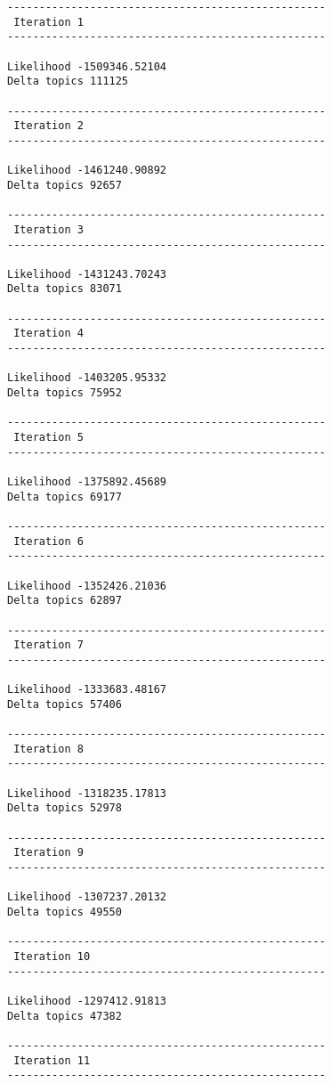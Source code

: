 \documentclass{article}
\begin{document}
    \begin{Verbatim}[commandchars=\\\{\}]
-------------------------------------------------- 
 Iteration 1 
-------------------------------------------------- 

Likelihood -1509346.52104
Delta topics 111125 

-------------------------------------------------- 
 Iteration 2 
-------------------------------------------------- 

Likelihood -1461240.90892
Delta topics 92657 

-------------------------------------------------- 
 Iteration 3 
-------------------------------------------------- 

Likelihood -1431243.70243
Delta topics 83071 

-------------------------------------------------- 
 Iteration 4 
-------------------------------------------------- 

Likelihood -1403205.95332
Delta topics 75952 

-------------------------------------------------- 
 Iteration 5 
-------------------------------------------------- 

Likelihood -1375892.45689
Delta topics 69177 

-------------------------------------------------- 
 Iteration 6 
-------------------------------------------------- 

Likelihood -1352426.21036
Delta topics 62897 

-------------------------------------------------- 
 Iteration 7 
-------------------------------------------------- 

Likelihood -1333683.48167
Delta topics 57406 

-------------------------------------------------- 
 Iteration 8 
-------------------------------------------------- 

Likelihood -1318235.17813
Delta topics 52978 

-------------------------------------------------- 
 Iteration 9 
-------------------------------------------------- 

Likelihood -1307237.20132
Delta topics 49550 

-------------------------------------------------- 
 Iteration 10 
-------------------------------------------------- 

Likelihood -1297412.91813
Delta topics 47382 

-------------------------------------------------- 
 Iteration 11 
-------------------------------------------------- 


\end{Verbatim}
\end{document}
